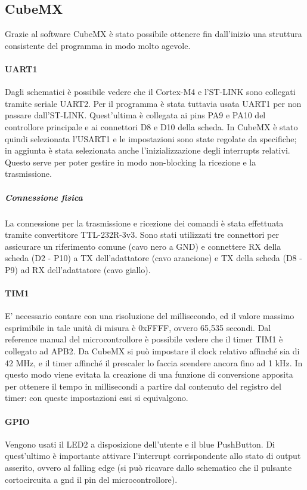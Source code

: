 \documentclass[a4paper]{article}
\begin{document}
	\subsection{CubeMX}
		Grazie al software CubeMX è stato possibile ottenere fin dall'inizio una struttura consistente del programma in modo molto agevole. 
		\paragraph{UART1} Dagli schematici è possibile vedere che il Cortex-M4 e l'ST-LINK sono collegati tramite seriale UART2. Per il programma è stata tuttavia usata UART1 per non passare dall'ST-LINK. Quest'ultima è collegata ai pins PA9 e PA10 del controllore principale e ai connettori D8 e D10 della scheda.
		In CubeMX è stato quindi selezionata l'USART1 e le impostazioni sono state regolate da specifiche; in aggiunta è stata selezionata anche l'inizializzazione degli interrupts relativi. Questo serve per poter gestire in modo non-blocking la ricezione e la trasmissione.
		\subparagraph*{Connessione fisica} La connessione per la trasmissione e ricezione dei comandi è stata effettuata tramite convertitore TTL-232R-3v3. Sono stati utilizzati tre connettori per assicurare un riferimento comune (cavo nero a GND) e connettere RX della scheda (D2 - P10) a TX dell'adattatore (cavo arancione) e TX della scheda (D8 - P9) ad RX dell'adattatore (cavo giallo).
		\paragraph{TIM1} E' necessario contare con una risoluzione del millisecondo, ed il valore massimo esprimibile in tale unità di misura è 0xFFFF, ovvero 65,535 secondi. 
		Dal reference manual del microcontrollore è possibile vedere che il timer TIM1 è collegato ad APB2. Da CubeMX si può impostare il clock relativo affinché sia di 42 MHz, e il timer affinché il prescaler lo faccia scendere ancora fino ad 1 kHz. In questo modo viene evitata la creazione di una funzione di conversione apposita per ottenere il tempo in millisecondi a partire dal contenuto del registro del timer: con queste impostazioni essi si equivalgono.
		\paragraph{GPIO} Vengono usati il LED2 a disposizione dell'utente e il blue PushButton. Di quest'ultimo è importante attivare l'interrupt corrispondente allo stato di output asserito, ovvero al falling edge (si può ricavare dallo schematico che il pulsante cortocircuita a gnd il pin del microcontrollore).
\end{document}
